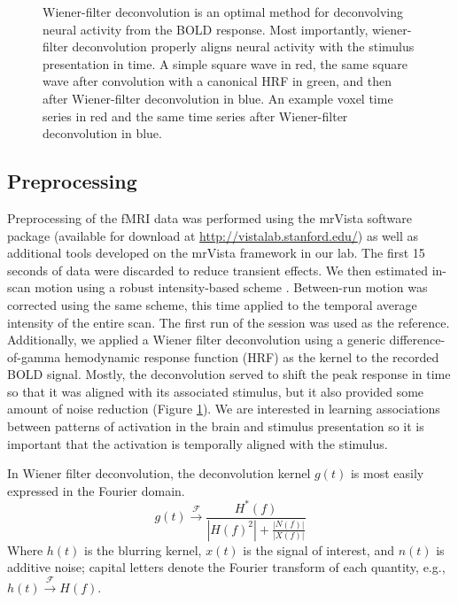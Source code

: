 \documentclass[review,1p,authoryear]{elsarticle}
\begin{document}
\begin{figure}
\begin{subfigure}{0.4\textwidth}
\caption{}
\label{fig:wiener-voxel}
\end{subfigure}
\caption{
Wiener-filter deconvolution is an optimal method for deconvolving neural activity from the BOLD response.
Most importantly, wiener-filter deconvolution properly aligns neural activity with the stimulus presentation in time.
 A simple square wave in red, the same square wave after convolution with a canonical HRF in green, and then after Wiener-filter deconvolution in blue. 
 An example voxel time series in red and the same time series after Wiener-filter deconvolution in blue.}
\label{fig:wiener-deconvolution}
\end{figure}

\subsection{Preprocessing}
Preprocessing of the fMRI data was performed using the mrVista software package (available for download at \url{http://vistalab.stanford.edu/}) as well as additional tools developed on the mrVista framework in our lab. 
The first 15 seconds of data  were discarded to reduce transient effects.
We then estimated in-scan motion using a robust intensity-based scheme \citep{Nestares2000}. 
Between-run motion was corrected using the same scheme, this time applied to the temporal average intensity of the entire scan. 
The first run of the session was used as the reference. 
Additionally, we applied a Wiener filter deconvolution \citep{Poor1980} using a generic difference-of-gamma hemodynamic response function (HRF) \citep{Glover1999} as the kernel to the recorded BOLD signal.
Mostly, the deconvolution served to shift the peak response in time so that it was aligned with its associated stimulus, but it also provided some amount of noise reduction (Figure \ref{fig:wiener-voxel}).
We are interested in learning associations between patterns of activation in the brain and stimulus presentation so it is important that the activation is temporally aligned with the stimulus.

In Wiener filter deconvolution, the deconvolution kernel $g(t)$ is most easily expressed in the Fourier domain.
\begin{equation}
g(t) \xrightarrow{\mathcal{F}} \frac{H^{*}(f)}{\left|H(f)^{2}\right| + \frac{\left| N(f) \right|}{\left| X(f) \right|}}
\end{equation}
Where $h(t)$ is the blurring kernel, $x(t)$ is the signal of interest, and $n(t)$ is additive noise; capital letters denote the Fourier transform of each quantity, e.g., $h(t) \xrightarrow{\mathcal{F}} H(f)$.
\end{document}

